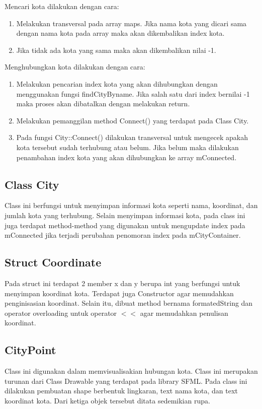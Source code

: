 \documentclass[]{article}
\begin{document}
Mencari kota dilakukan dengan cara:
\begin{enumerate}
    \item Melakukan transversal pada array maps. Jika nama kota yang dicari sama dengan nama kota pada array maka akan dikembalikan index kota.
    \item Jika tidak ada kota yang sama maka akan dikembalikan nilai -1.
\end{enumerate}
Menghubungkan kota dilakukan dengan cara:
\begin{enumerate}
    \item Melakukan pencarian index kota yang akan dihubungkan dengan menggunakan fungsi findCityByname. Jika salah satu dari index bernilai -1 maka proses akan dibatalkan dengan melakukan return.
    \item Melakukan pemanggilan method Connect() yang terdapat pada Class City.
    \item Pada fungsi City::Connect() dilakukan transversal untuk mengecek apakah kota tersebut sudah terhubung atau belum. Jika belum maka dilakukan penambahan index kota yang akan dihubungkan ke array mConnected.
\end{enumerate}
\subsection{Class City}
\par
Class ini berfungsi untuk menyimpan informasi kota seperti nama, koordinat, dan jumlah kota yang terhubung. Selain menyimpan informasi kota,
pada class ini juga terdapat method-method yang digunakan untuk mengupdate index pada mConnected jika terjadi perubahan penomoran index pada mCityContainer.
\subsection{Struct Coordinate}
\par
Pada struct ini terdapat 2 member x dan y berupa int yang berfungsi untuk menyimpan koordinat kota. Terdapat juga Constructor agar memudahkan penginisasian koordinat. Selain itu, dibuat method
bernama formatedString dan operator overloading untuk operator \(<\!\!<\) agar memudahkan penulisan koordinat.
\subsection{CityPoint}
\par
Class ini digunakan dalam memvisualisakian hubungan kota. Class ini merupakan turunan dari Class Drawable yang terdapat pada library SFML. 
Pada class ini dilakukan pembuatan shape berbentuk lingkaran, text nama kota, dan text koordinat kota. Dari ketiga objek tersebut ditata sedemikian rupa.
\end{document}
